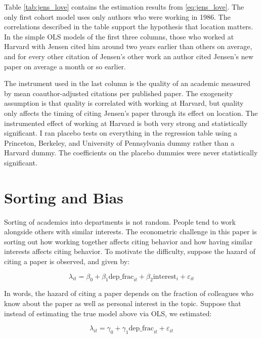 Table \ref{tab:jens_love} contains the estimation results from \eqref{eq:jens_love}.
The only first cohort model uses only authors who were working in 1986.  The
correlations described in the table support the hypothesis that location matters.
In the simple OLS models of the first three columns, those who worked at
Harvard with Jensen cited him around two years earlier than others on
average, and for every other citation of Jensen's other work an author
cited Jensen's new paper on average a month or so earlier.

The instrument used in the last column is the quality of an academic measured by
mean coauthor-adjusted citations per published paper. The exogeneity
assumption is that quality is correlated with working at Harvard, but
quality only affects the timing of citing Jensen's paper through its
effect on location. The instrumented effect of working at Harvard is
both very strong and statistically significant. I ran placebo tests on
everything in the regression table using a Princeton, Berkeley, and
University of Pennsylvania dummy rather than a Harvard dummy. The
coefficients on the placebo dummies were never statistically
significant.

\section{Sorting and Bias}
\label{sec:sortbias}

Sorting of academics into departments is not random. People tend to work
alongside others with similar interests. The econometric challenge in
this paper is sorting out how working together affects citing behavior
and how having similar interests affects citing behavior. To motivate
the difficulty, suppose the hazard of citing a paper is observed, and
given by:

\begin{equation}
\lambda_{it} = \beta_0 + \beta_1 \mbox{dep\_frac}_{it} + \beta_2 \mbox{interest}_i + \varepsilon_{it}
\end{equation}

In words, the hazard of citing a paper depends on the fraction of
colleagues who know about the paper as well as personal interest in the
topic. Suppose that instead of estimating the true model above via OLS,
we estimated:

\begin{equation}
\lambda_{it} = \gamma_0 + \gamma_1 \mbox{dep\_frac}_{it} + \varepsilon_{it}
\end{equation}


